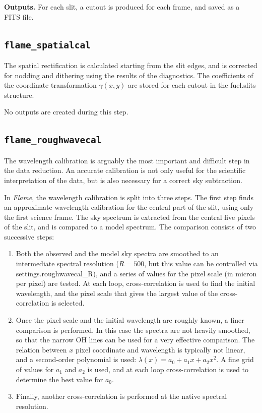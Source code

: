 \documentclass[a4paper]{article}
\newcommand{\flame}{\emph{Flame}}
\begin{document}
\begin{sloppypar}
\medskip
\noindent
\textbf{Outputs.} For each slit, a cutout is produced for each frame, and saved as a FITS file.

\subsection{\texttt{flame\_spatialcal}}

The spatial rectification is calculated starting from the slit edges, and is corrected for nodding and dithering using the results of the diagnostics. The coefficients of the coordinate transformation $\gamma(x,y)$ are stored for each cutout in the fuel.slits structure.

\medskip
\noindent
No outputs are created during this step.


\subsection{\texttt{flame\_roughwavecal}}

The wavelength calibration is arguably the most important and difficult step in the data reduction. An accurate calibration is not only useful for the scientific interpretation of the data, but is also necessary for a correct sky subtraction.

In \flame, the wavelength calibration is split into three steps. The first step finds an approximate wavelength calibration for the central part of the slit, using only the first science frame. The sky spectrum is extracted from the central five pixels of the slit, and is compared to a model spectrum. The comparison consists of two successive steps:
\begin{enumerate}
\item Both the observed and the model sky spectra are smoothed to an intermediate spectral resolution ($R=500$, but this value can be controlled via settings.roughwavecal\_R), and a series of values for the pixel scale (in micron per pixel) are tested. At each loop, cross-correlation is used to find the initial wavelength, and the pixel scale that gives the largest value of the cross-correlation is selected.
\item Once the pixel scale and the initial wavelength are roughly known, a finer comparison is performed. In this case the spectra are not heavily smoothed, so that the narrow OH lines can be used for a very effective comparison. The relation between $x$ pixel coordinate and wavelength is typically not linear, and a second-order polynomial is used: $\lambda(x) = a_0 + a_1 x + a_2 x^2$. A fine grid of values for $a_1$ and $a_2$ is used, and at each loop cross-correlation is used to determine the best value for $a_0$.
\item Finally, another cross-correlation is performed at the native spectral resolution.
\end{enumerate}


\end{sloppypar}
\end{document}
